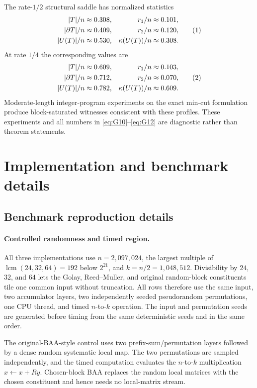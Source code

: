The rate-$1/2$ structural saddle has normalized statistics
\[
\begin{aligned}
|T|/n&\approx0.308,& r_1/n&\approx0.101,\\
|\partial T|/n&\approx0.409,& r_2/n&\approx0.120,\\
|U(T)|/n&\approx0.530,& \kappa(U(T))/n&\approx0.308.
\end{aligned}
\eqnumlabel{eq:G11}
\]
At rate $1/4$ the corresponding values are
\[
\begin{aligned}
|T|/n&\approx0.609,& r_1/n&\approx0.103,\\
|\partial T|/n&\approx0.712,& r_2/n&\approx0.070,\\
|U(T)|/n&\approx0.782,& \kappa(U(T))/n&\approx0.609.
\end{aligned}
\eqnumlabel{eq:G12}
\]
Moderate-length integer-program experiments on the exact min-cut formulation
produce block-saturated witnesses consistent with these profiles.  These
experiments and all numbers in \eqref{eq:G10}--\eqref{eq:G12} are diagnostic rather than theorem
statements.




\section{Implementation and benchmark details}

\subsection{Benchmark reproduction details}
\label{app:benchmarks}

\paragraph{Controlled randomness and timed region.}
All three implementations use $n=2{,}097{,}024$, the largest multiple of
$\operatorname{lcm}(24,32,64)=192$ below $2^{21}$, and
$k=n/2=1{,}048{,}512$.  Divisibility by $24$, $32$, and $64$ lets the Golay,
Reed--Muller, and original random-block constituents tile one common input
without truncation.  All rows therefore use the same input, two accumulator
layers, two independently seeded pseudorandom permutations, one CPU thread, and
timed $n$-to-$k$ operation.  The input and permutation seeds are generated
before timing from the same deterministic seeds and in the same order.

The original-BAA-style control uses two prefix-sum/permutation layers followed by a
dense random systematic local map.  The two permutations are sampled
independently, and the timed computation evaluates the $n$-to-$k$
multiplication $x\leftarrow x+Ry$.  Chosen-block BAA replaces the random local
matrices with the chosen constituent and hence needs no local-matrix stream.

